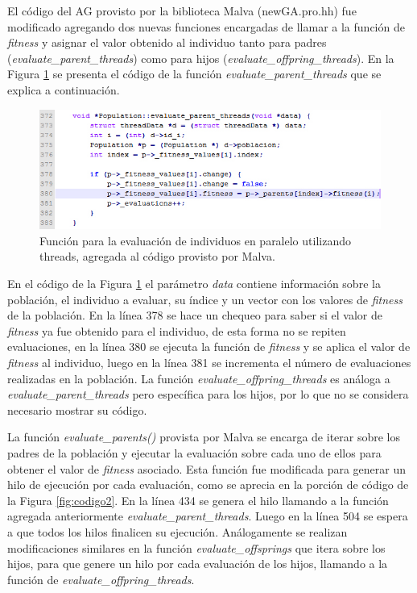 El código del AG provisto por la biblioteca Malva (newGA.pro.hh) fue modificado agregando dos nuevas funciones encargadas de llamar a la función de \emph{fitness} y asignar el valor obtenido al individuo tanto para padres (\emph{evaluate{\_}parent{\_}threads}) como para hijos (\emph{evaluate{\_}offpring{\_}threads}). En la Figura \ref{fig:codigo1} se presenta el código de la función \emph{evaluate{\_}parent{\_}threads} que se explica a continuación. 

\begin{figure}[H]
	\centering
	\includegraphics[width=0.99\linewidth]{Figures/codigo1}
	\caption{Función para la evaluación de individuos en paralelo utilizando threads, agregada al código provisto por Malva.}
	\label{fig:codigo1}
\end{figure}

En el código de la Figura \ref{fig:codigo1} el parámetro \emph{data} contiene información sobre la población, el individuo a evaluar, su índice y un vector con los valores de \emph{fitness} de la población. En la línea 378 se hace un chequeo para saber si el valor de \emph{fitness} ya fue obtenido para el individuo, de esta forma no se repiten evaluaciones, en la línea 380 se ejecuta la función de \emph{fitness} y se aplica el valor de \emph{fitness} al individuo, luego en la línea 381 se incrementa el número de evaluaciones realizadas en la población.
La función \emph{evaluate{\_}offpring{\_}threads} es análoga a \emph{evaluate{\_}parent{\_}threads} pero específica para los hijos, por lo que no se considera necesario mostrar su código.
	
La función \emph{evaluate{\_}parents()} provista por Malva se encarga de iterar sobre los padres de la población y ejecutar la evaluación sobre cada uno de ellos para obtener el valor de \emph{fitness} asociado. Esta función fue modificada para generar un hilo de ejecución por cada evaluación, como se aprecia en la porción de código de la Figura \ref{fig:codigo2}.
En la línea 434  se genera el hilo llamando a la función agregada anteriormente \emph{evaluate{\_}parent{\_}threads}. Luego en la línea 504 se espera a que todos los hilos finalicen su ejecución. Análogamente se realizan modificaciones similares en la función 	\emph{evaluate{\_}offsprings }que itera sobre los hijos, para que genere un hilo por cada evaluación de los hijos, llamando a la función de  \emph{evaluate{\_}offpring{\_}threads}.
		
